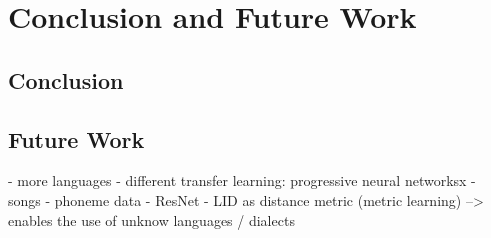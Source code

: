 \section{Conclusion and Future Work}
\label{sec:summary}

\subsection{Conclusion}
\subsection{Future Work}


- more languages
- different transfer learning: progressive neural networksx
- songs
- phoneme data
- ResNet
- LID as distance metric (metric learning) --> enables the use of unknow languages / dialects